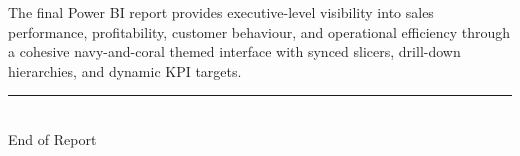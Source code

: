 \documentclass[11pt,a4paper]{article}
\begin{document}
The final Power BI report provides executive-level visibility into sales performance, profitability, customer behaviour, and operational efficiency through a cohesive navy-and-coral themed interface with synced slicers, drill-down hierarchies, and dynamic KPI targets.

\vfill
\begin{center}
\rule{0.4\textwidth}{0.5pt}\\[0.5em]
{\color{navy}\small End of Report}
\end{center}
\end{document}
